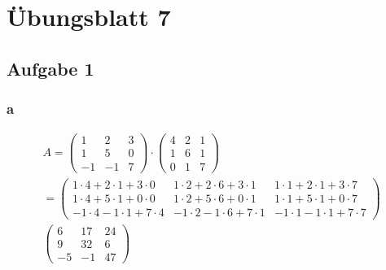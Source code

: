 \allowdisplaybreaks 

\chapter{Übungsblatt 7}

\section{Aufgabe 1}

\subsection{a}
\begin{align*}
    A = \begin{pmatrix}
        1 & 2 & 3 \\ 1 & 5 & 0 \\ -1 & -1 & 7
    \end{pmatrix} \cdot \begin{pmatrix}
        4 & 2 & 1 \\ 1 & 6 & 1 \\ 0 & 1 & 7
    \end{pmatrix} \\
    = \begin{pmatrix}
        1 \cdot 4 + 2 \cdot 1 + 3 \cdot 0 & 1 \cdot 2 + 2 \cdot 6 + 3 \cdot 1 & 1 \cdot 1 + 2 \cdot 1 + 3 \cdot 7 \\
        1 \cdot 4 + 5 \cdot 1 + 0 \cdot 0 & 1 \cdot 2 + 5 \cdot 6 + 0 \cdot 1 & 1 \cdot 1 + 5 \cdot 1 + 0 \cdot 7 \\
        -1 \cdot 4 -1 \cdot 1 + 7 \cdot 4 & -1 \cdot 2 - 1 \cdot 6 + 7 \cdot 1 & -1 \cdot 1 - 1 \cdot 1 + 7 \cdot 7
    \end{pmatrix} \\
    \begin{pmatrix}
        6 & 17 & 24 \\ 9 & 32 & 6 \\ -5 & -1 & 47
    \end{pmatrix}
\end{align*}

